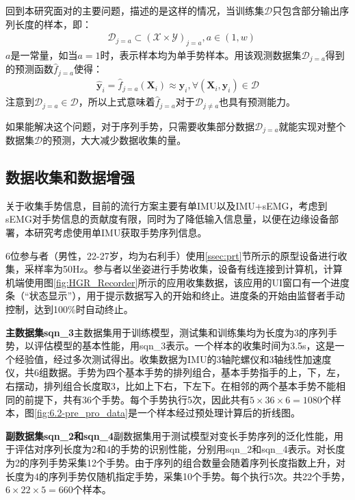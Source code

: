 回到本研究面对的主要问题，描述的是这样的情况，当训练集$\mathcal{D}$只包含部分输出序列长度的样本，即：
\begin{align}
&\mathcal{D}_{j=a} \subset (\mathcal{X} \times \mathcal{Y})_{j=a}, a \in (1, w)
\end{align}
$a$是一常量，如当$a=1$时，表示样本均为单手势样本。用该观测数据集$\mathcal{D}_{j=a}$得到的预测函数$\hat{f}_{j=a}$使得：
\begin{align}
\hat{\mathbf{y}}_i=\hat{f}_{j=a}(\mathbf{X}_i)\approx\mathbf{y}_i, \forall (\mathbf{X}_i, \mathbf{y}_i) \in \mathcal{D}
\end{align}
注意到$\mathcal{D}_{j=a}\in \mathcal{D}$，所以上式意味着$\hat{f}_{j=a}$对于$\mathcal{D}_{j\neq a}$也具有预测能力。

如果能解决这个问题，对于序列手势，只需要收集部分数据$\mathcal{D}_{j=a}$就能实现对整个数据集$\mathcal{D}$的预测，大大减少数据收集的量。

\subsection{数据收集和数据增强}\label{ssec:data_clct}

关于收集手势信息，目前的流行方案主要有单IMU以及IMU+sEMG，考虑到sEMG对手势信息的贡献度有限\cites{li2022research}，同时为了降低输入信息量，以便在边缘设备部署，本研究考虑使用单IMU获取手势序列信息。

6位参与者（男性，22-27岁，均为右利手）使用\ref{ssec:prt}节所示的原型设备进行收集，采样率为50Hz。参与者以坐姿进行手势收集，设备有线连接到计算机，计算机端使用图\ref{fig:HGR_Recorder}所示的应用收集数据，该应用的UI窗口有一个进度条（“状态显示”），用于提示数据写入的开始和终止。进度条的开始由监督者手动控制，达到100\%时自动终止。

\textbf{主数据集sqn\_3}\hspace{5pt}主数据集用于训练模型，测试集和训练集均为长度为3的序列手势，以评估模型的基本性能，用sqn\_3表示。一个样本的收集时间为3.5s，这是一个经验值，经过多次测试得出。收集数据为IMU的3轴陀螺仪和3轴线性加速度仪，共6组数据。手势为四个基本手势的排列组合，基本手势指手的上，下，左，右摆动，排列组合长度取3，比如上下右，下左下。在相邻的两个基本手势不能相同的前提下，共有36个手势。每个手势执行5次，因此共有$5\times 36\times 6 = 1080$个样本，图\ref{fig:6.2-pre_pro_data}是一个样本经过预处理计算后的折线图。

\textbf{副数据集sqn\_2和sqn\_4}\hspace{5pt}副数据集用于测试模型对变长手势序列的泛化性能，用于评估对序列长度为2和4的手势的识别性能，分别用sqn\_2和sqn\_4表示。对长度为2的序列手势采集12个手势。由于序列的组合数量会随着序列长度指数上升，对长度为4的序列手势仅随机指定手势，采集10个手势。每个执行5次。共22个手势，$6\times 22\times 5=660$个样本。

